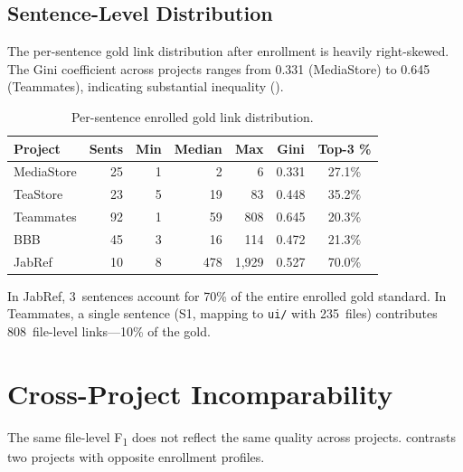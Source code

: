 \documentclass[11pt,a4paper]{report}
\newcommand{\fone}{F\textsubscript{1}\xspace}
\begin{document}
\subsection{Sentence-Level Distribution}

The per-sentence gold link distribution after enrollment is heavily
right-skewed. The Gini coefficient across projects ranges from 0.331
(MediaStore) to 0.645 (Teammates), indicating substantial inequality
().

\begin{table}[h]
\caption{Per-sentence enrolled gold link distribution.}
\label{tab:sent_gini}
\centering\small
\begin{tabular}{lrrrrcc}
\toprule
\textbf{Project} & \textbf{Sents} & \textbf{Min} & \textbf{Median} & \textbf{Max} & \textbf{Gini} & \textbf{Top-3 \%} \\
\midrule
MediaStore  & 25 & 1   & 2   & 6     & 0.331 & 27.1\% \\
TeaStore    & 23 & 5   & 19  & 83    & 0.448 & 35.2\% \\
Teammates   & 92 & 1   & 59  & 808   & 0.645 & 20.3\% \\
BBB         & 45 & 3   & 16  & 114   & 0.472 & 21.3\% \\
JabRef      & 10 & 8   & 478 & 1,929 & 0.527 & 70.0\% \\
\bottomrule
\end{tabular}
\end{table}

In JabRef, 3~sentences account for 70\% of the entire enrolled gold standard.
In Teammates, a single sentence (S1, mapping to \texttt{ui/} with 235~files)
contributes 808~file-level links---10\% of the gold.


\section{Cross-Project Incomparability}
\label{sec:ineq:incomparable}

The same file-level \fone does not reflect the same quality across projects.
 contrasts two projects with opposite enrollment
profiles.
\end{document}

